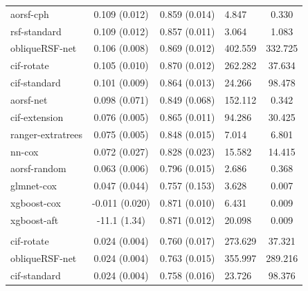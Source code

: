\documentclass[twoside,11pt]{article}\usepackage[]{graphicx}\usepackage[]{xcolor}
\newenvironment{knitrout}{}{} %
\begin{document}
\begin{knitrout}
\begin{longtable}[t]{lcclc}
\hspace{1em}aorsf-cph & 0.109 (0.012) & 0.859 (0.014) & 4.847 & 0.330\\
\hspace{1em}rsf-standard & 0.109 (0.012) & 0.857 (0.011) & 3.064 & 1.083\\
\hspace{1em}obliqueRSF-net & 0.106 (0.008) & 0.869 (0.012) & 402.559 & 332.725\\
\hspace{1em}cif-rotate & 0.105 (0.010) & 0.870 (0.012) & 262.282 & 37.634\\
\hspace{1em}cif-standard & 0.101 (0.009) & 0.864 (0.013) & 24.266 & 98.478\\
\hspace{1em}aorsf-net & 0.098 (0.071) & 0.849 (0.068) & 152.112 & 0.342\\
\hspace{1em}cif-extension & 0.076 (0.005) & 0.865 (0.011) & 94.286 & 30.425\\
\hspace{1em}ranger-extratrees & 0.075 (0.005) & 0.848 (0.015) & 7.014 & 6.801\\
\hspace{1em}nn-cox & 0.072 (0.027) & 0.828 (0.023) & 15.582 & 14.415\\
\hspace{1em}aorsf-random & 0.063 (0.006) & 0.796 (0.015) & 2.686 & 0.368\\
\hspace{1em}glmnet-cox & 0.047 (0.044) & 0.757 (0.153) & 3.628 & 0.007\\
\hspace{1em}xgboost-cox & -0.011 (0.020) & 0.871 (0.010) & 6.431 & 0.009\\
\hspace{1em}xgboost-aft & -11.1 (1.34) & 0.871 (0.012) & 20.098 & 0.009\\
\addlinespace[0.3em]
\hline
\multicolumn{5}{l}{\textit{\textbf{MESA; stroke, n = 6783, p = 48}}}\\
\hline
\hspace{1em}cif-rotate & 0.024 (0.004) & 0.760 (0.017) & 273.629 & 37.321\\
\hspace{1em}obliqueRSF-net & 0.024 (0.004) & 0.763 (0.015) & 355.997 & 289.216\\
\hspace{1em}cif-standard & 0.024 (0.004) & 0.758 (0.016) & 23.726 & 98.376\\

\end{longtable}
\end{knitrout}
\end{document}
